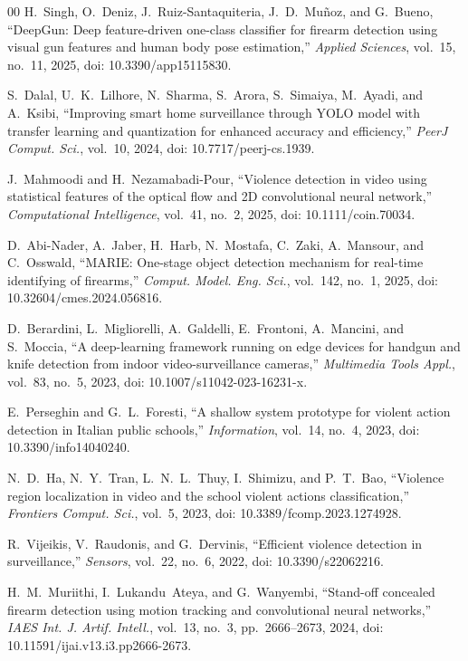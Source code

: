 \documentclass[conference]{IEEEtran}
\begin{document}
\begin{thebibliography}{00}
 H.~Singh, O.~Deniz, J.~Ruiz-Santaquiteria, J.~D.~Mu\~{n}oz, and G.~Bueno, ``DeepGun: Deep feature-driven one-class classifier for firearm detection using visual gun features and human body pose estimation,'' \textit{Applied Sciences}, vol.~15, no.~11, 2025, doi: 10.3390/app15115830.

 S.~Dalal, U.~K.~Lilhore, N.~Sharma, S.~Arora, S.~Simaiya, M.~Ayadi, and A.~Ksibi, ``Improving smart home surveillance through YOLO model with transfer learning and quantization for enhanced accuracy and efficiency,'' \textit{PeerJ Comput. Sci.}, vol.~10, 2024, doi: 10.7717/peerj-cs.1939.

 J.~Mahmoodi and H.~Nezamabadi-Pour, ``Violence detection in video using statistical features of the optical flow and 2D convolutional neural network,'' \textit{Computational Intelligence}, vol.~41, no.~2, 2025, doi: 10.1111/coin.70034.

 D.~Abi-Nader, A.~Jaber, H.~Harb, N.~Mostafa, C.~Zaki, A.~Mansour, and C.~Osswald, ``MARIE: One-stage object detection mechanism for real-time identifying of firearms,'' \textit{Comput. Model. Eng. Sci.}, vol.~142, no.~1, 2025, doi: 10.32604/cmes.2024.056816.

 D.~Berardini, L.~Migliorelli, A.~Galdelli, E.~Frontoni, A.~Mancini, and S.~Moccia, ``A deep-learning framework running on edge devices for handgun and knife detection from indoor video-surveillance cameras,'' \textit{Multimedia Tools Appl.}, vol.~83, no.~5, 2023, doi: 10.1007/s11042-023-16231-x.

 E.~Perseghin and G.~L.~Foresti, ``A shallow system prototype for violent action detection in Italian public schools,'' \textit{Information}, vol.~14, no.~4, 2023, doi: 10.3390/info14040240.

 N.~D.~Ha, N.~Y.~Tran, L.~N.~L.~Thuy, I.~Shimizu, and P.~T.~Bao, ``Violence region localization in video and the school violent actions classification,'' \textit{Frontiers Comput. Sci.}, vol.~5, 2023, doi: 10.3389/fcomp.2023.1274928.

 R.~Vijeikis, V.~Raudonis, and G.~Dervinis, ``Efficient violence detection in surveillance,'' \textit{Sensors}, vol.~22, no.~6, 2022, doi: 10.3390/s22062216.

 H.~M.~Muriithi, I.~Lukandu~Ateya, and G.~Wanyembi, ``Stand-off concealed firearm detection using motion tracking and convolutional neural networks,'' \textit{IAES Int. J. Artif. Intell.}, vol.~13, no.~3, pp.~2666--2673, 2024, doi: 10.11591/ijai.v13.i3.pp2666-2673.


\end{thebibliography}
\end{document}
